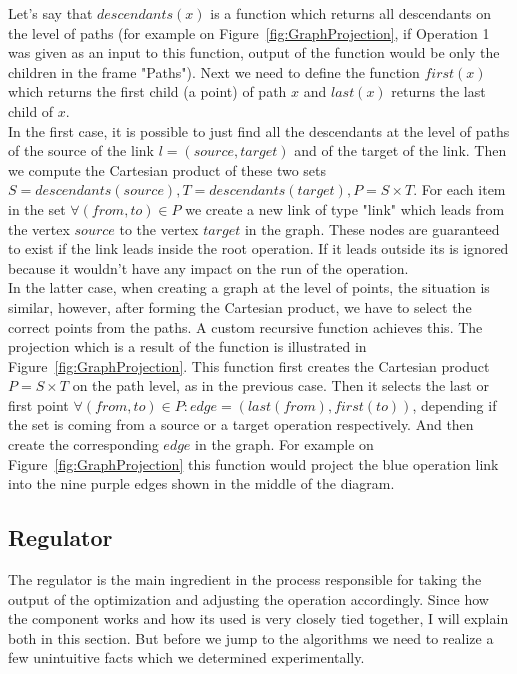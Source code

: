Let’s say that $descendants(x)$ is a function which returns all descendants on the level of paths (for example on Figure~\ref{fig:GraphProjection}, if Operation 1 was given as an input to this function, output of the function would be only the children in the frame "Paths"). Next we need to define the function $first(x)$ which returns the first child (a point) of path $x$ and $last(x)$ returns the last child of $x$.\\

In the first case, it is possible to just find all the descendants at the level of paths of the source of the link $l = (source, target)$ and of the target of the link.
Then we compute the Cartesian product of these two sets $S = descendants(source), T = descendants(target), P = S \times T$. 
For each item in the set $\forall (from, to) \in P$ we create a new link of type "link" which leads from the vertex $source$ to the vertex $target$ in the graph. 
These nodes are guaranteed to exist if the link leads inside the root operation. 
If it leads outside its is ignored because it wouldn't have any impact on the run of the operation. \\

In the latter case, when creating a graph at the level of points, the situation is similar, however, after forming the Cartesian product, we have to select the correct points from the paths. A custom recursive function  achieves this. The projection which is a result of the function is illustrated in Figure~\ref{fig:GraphProjection}. This function first creates the Cartesian product $P = S \times T$ on the path level, as in the previous case. Then it selects the last or first point $\forall (from, to) \in P: edge = (last(from), first(to))$, depending if the set is coming from a source or a target operation respectively. And then create the corresponding $edge$ in the graph. For example on Figure~\ref{fig:GraphProjection} this function would project the blue operation link into the nine purple edges shown in the middle of the diagram.

\subsection{Regulator}


The regulator is the main ingredient in the process responsible for taking the output of the optimization and adjusting the operation accordingly. Since how the component works and how its used is very closely tied together, I will explain both in this section. But before we jump to the algorithms we need to realize a few unintuitive facts which we determined experimentally. \\

